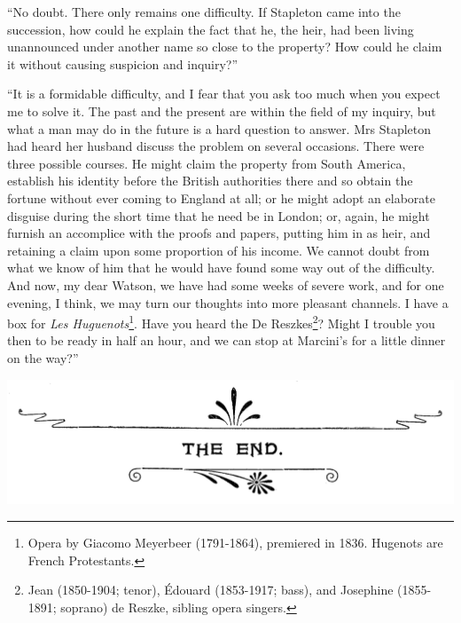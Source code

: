 \documentclass[paper=5.5in:8.5in,BCOR=7mm,twoside,DIV=calc,12pt,usegeometry,openany,chapterprefix,endperiod]{scrbook} %
\begin{document}
\enquote{No doubt. There only remains one difficulty. If Stapleton came into the succession, how could he explain the fact that he, the heir, had been living unannounced under another name so close to the property? How could he claim it without causing suspicion and inquiry?}

\enquote{It is a formidable difficulty, and I fear that you ask too much when you expect me to solve it. The past and the present are within the field of my inquiry, but what a man may do in the future is a hard question to answer. Mrs Stapleton had heard her husband discuss the problem on several occasions. There were three possible courses. He might claim the property from South America, establish his identity before the British authorities there and so obtain the fortune without ever coming to England at all; or he might adopt an elaborate disguise during the short time that he need be in London; or, again, he might furnish an accomplice with the proofs and papers, putting him in as heir, and retaining a claim upon some proportion of his income. We cannot doubt from what we know of him that he would have found some way out of the difficulty. And now, my dear Watson, we have had some weeks of severe work, and for one evening, I think, we may turn our thoughts into more pleasant channels. I have a box for \textit{Les Huguenots}\footnote{Opera by Giacomo Meyerbeer (1791-1864), premiered in 1836. Hugenots are French Protestants.}. Have you heard the De Reszkes\footnote{Jean (1850-1904; tenor), Édouard (1853-1917; bass), and Josephine (1855-1891; soprano) de Reszke, sibling opera singers.}? Might I trouble you then to be ready in half an hour, and we can stop at Marcini's for a little dinner on the way?}

\centering
\includegraphics[width=0.9\linewidth]{theend}


\end{document}
